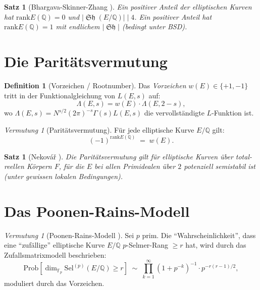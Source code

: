 \documentclass[12pt,a4paper]{amsart}
\newtheorem{satz}[theorem]{Satz}
\theoremstyle{definition}
\newtheorem{definition_de}[theorem]{Definition}
\theoremstyle{remark}
\newtheorem{vermutung}[theorem]{Vermutung}
\newcommand{\Q}{\mathbb{Q}}
\newcommand{\F}{\mathbb{F}}
\newcommand{\Sel}{\mathrm{Sel}}
\DeclareMathOperator{\Sha}{\mathfrak{Sh}}
\newcommand{\Prob}{\mathrm{Prob}}
\newcommand{\rank}{\mathrm{rank}}
\begin{document}
\begin{satz}[Bhargava-Skinner-Zhang \cite{BSZ2014}]
  Ein positiver Anteil der elliptischen Kurven hat $\rank E(\Q) = 0$ und
  $|\Sha(E/\Q)| \mid 4$.
  Ein positiver Anteil hat $\rank E(\Q) = 1$ mit endlichem $|\Sha|$
  (bedingt unter BSD).
\end{satz}

\section{Die Paritätsvermutung}\label{sec:paritaet}

\begin{definition_de}[Vorzeichen / Rootnumber]
  Das \emph{Vorzeichen} $w(E) \in \{+1, -1\}$ tritt in der Funktionalgleichung von
  $L(E,s)$ auf:
  \[
    \Lambda(E,s) = w(E) \cdot \Lambda(E, 2-s),
  \]
  wo $\Lambda(E,s) = N^{s/2}(2\pi)^{-s}\Gamma(s) L(E,s)$ die vervollständigte
  $L$-Funktion ist.
\end{definition_de}

\begin{vermutung}[Paritätsvermutung]\label{verm:paritaet}
  Für jede elliptische Kurve $E/\Q$ gilt:
  \[
    (-1)^{\rank E(\Q)} \;=\; w(E).
  \]
\end{vermutung}

\begin{satz}[Nekovář \cite{Nekovar2009}]
  Die Paritätsvermutung gilt für elliptische Kurven über total-reellen Körpern $F$,
  für die $E$ bei allen Primidealen über $2$ potenziell semistabil ist
  (unter gewissen lokalen Bedingungen).
\end{satz}

\section{Das Poonen-Rains-Modell}\label{sec:poonen_rains}

\begin{vermutung}[Poonen-Rains-Modell \cite{PR2012}]\label{verm:pr}
  Sei $p$ prim. Die ``Wahrscheinlichkeit'', dass eine ``zufällige'' elliptische Kurve
  $E/\Q$ $p$-Selmer-Rang $\geq r$ hat, wird durch das Zufallsmatrixmodell beschrieben:
  \[
    \Prob[\dim_{\F_p} \Sel^{(p)}(E/\Q) \geq r] \;\sim\;
    \prod_{k=1}^\infty (1 + p^{-k})^{-1} \cdot p^{-r(r-1)/2},
  \]
  moduliert durch das Vorzeichen.
\end{vermutung}
\end{document}
